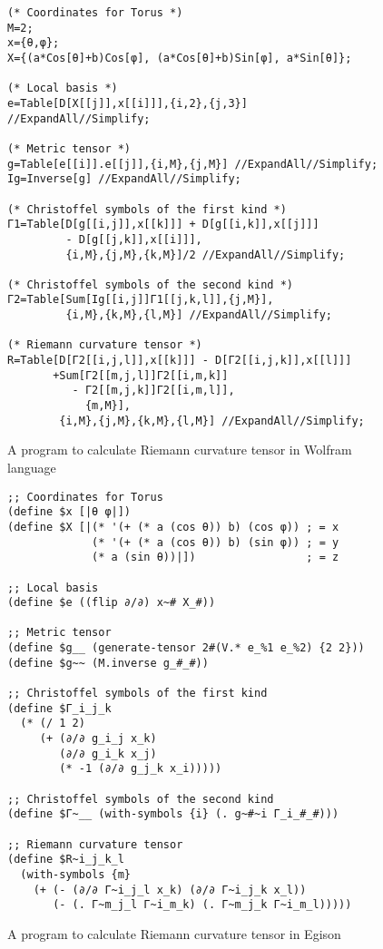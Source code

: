 \documentclass[acmlarge]{acmart}
\begin{document}
\begin{figure}[t]
  \begin{center}
{\footnotesize
\begin{verbatim}
(* Coordinates for Torus *)
M=2;
x={θ,φ};
X={(a*Cos[θ]+b)Cos[φ], (a*Cos[θ]+b)Sin[φ], a*Sin[θ]};

(* Local basis *)
e=Table[D[X[[j]],x[[i]]],{i,2},{j,3}] //ExpandAll//Simplify;

(* Metric tensor *)
g=Table[e[[i]].e[[j]],{i,M},{j,M}] //ExpandAll//Simplify;
Ig=Inverse[g] //ExpandAll//Simplify;

(* Christoffel symbols of the first kind *)
Γ1=Table[D[g[[i,j]],x[[k]]] + D[g[[i,k]],x[[j]]]
         - D[g[[j,k]],x[[i]]],
         {i,M},{j,M},{k,M}]/2 //ExpandAll//Simplify;

(* Christoffel symbols of the second kind *)
Γ2=Table[Sum[Ig[[i,j]]Γ1[[j,k,l]],{j,M}],
         {i,M},{k,M},{l,M}] //ExpandAll//Simplify;

(* Riemann curvature tensor *)
R=Table[D[Γ2[[i,j,l]],x[[k]]] - D[Γ2[[i,j,k]],x[[l]]]
       +Sum[Γ2[[m,j,l]]Γ2[[i,m,k]]
          - Γ2[[m,j,k]]Γ2[[i,m,l]],
            {m,M}],
        {i,M},{j,M},{k,M},{l,M}] //ExpandAll//Simplify;
\end{verbatim}
}
  \end{center}
  \caption{A program to calculate Riemann curvature tensor in Wolfram language}
  \label{fig:inWolfram}
\end{figure}
\begin{figure}[t]
  \begin{center}
{\footnotesize
\begin{verbatim}
;; Coordinates for Torus
(define $x [|θ φ|])
(define $X [|(* '(+ (* a (cos θ)) b) (cos φ)) ; = x
             (* '(+ (* a (cos θ)) b) (sin φ)) ; = y
             (* a (sin θ))|])                 ; = z

;; Local basis
(define $e ((flip ∂/∂) x~# X_#))

;; Metric tensor
(define $g__ (generate-tensor 2#(V.* e_%1 e_%2) {2 2}))
(define $g~~ (M.inverse g_#_#))

;; Christoffel symbols of the first kind
(define $Γ_i_j_k
  (* (/ 1 2)
     (+ (∂/∂ g_i_j x_k)
        (∂/∂ g_i_k x_j)
        (* -1 (∂/∂ g_j_k x_i)))))

;; Christoffel symbols of the second kind
(define $Γ~__ (with-symbols {i} (. g~#~i Γ_i_#_#)))

;; Riemann curvature tensor
(define $R~i_j_k_l
  (with-symbols {m}
    (+ (- (∂/∂ Γ~i_j_l x_k) (∂/∂ Γ~i_j_k x_l))
       (- (. Γ~m_j_l Γ~i_m_k) (. Γ~m_j_k Γ~i_m_l)))))
\end{verbatim}
}
  \end{center}
  \caption{A program to calculate Riemann curvature tensor in Egison}
  \label{fig:inEgison}
\end{figure}
\end{document}

